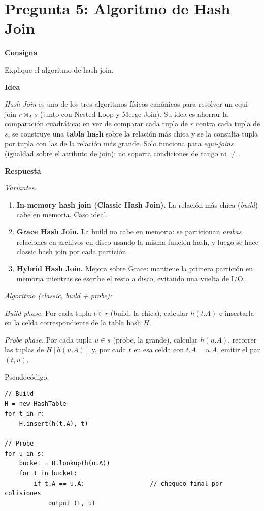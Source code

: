 \documentclass[11pt,a4paper]{article}
\newcommand{\itemcabecera}[1]{\noindent\textbf{#1}\par\medskip}
\newcommand{\bloqueConsigna}{\itemcabecera{Consigna}}
\newcommand{\bloqueIdea}{\itemcabecera{Idea}}
\newcommand{\bloqueRespuesta}{\itemcabecera{Respuesta}}
\begin{document}
\section{Pregunta 5: Algoritmo de Hash Join}

\bloqueConsigna

Explique el algoritmo de hash join.

\bloqueIdea

\emph{Hash Join} es uno de los tres algoritmos físicos canónicos para resolver un equi-join $r \bowtie_A s$ (junto con Nested Loop y Merge Join). Su idea es ahorrar la comparación cuadrática: en vez de comparar cada tupla de $r$ contra cada tupla de $s$, se construye una \textbf{tabla hash} sobre la relación más chica y se la consulta tupla por tupla con las de la relación más grande. Solo funciona para \emph{equi-joins} (igualdad sobre el atributo de join); no soporta condiciones de rango ni $\neq$.

\bloqueRespuesta

\textit{Variantes.}

\begin{enumerate}
    \item \textbf{In-memory hash join (Classic Hash Join).} La relación más chica (\emph{build}) cabe en memoria. Caso ideal.
    \item \textbf{Grace Hash Join.} La build no cabe en memoria: se particionan \emph{ambas} relaciones en archivos en disco usando la misma función hash, y luego se hace classic hash join por cada partición.
    \item \textbf{Hybrid Hash Join.} Mejora sobre Grace: mantiene la primera partición en memoria mientras se escribe el resto a disco, evitando una vuelta de I/O.
\end{enumerate}

\textit{Algoritmo (classic, build + probe):}

\textit{Build phase.} Por cada tupla $t \in r$ (build, la chica), calcular $h(t.A)$ e insertarla en la celda correspondiente de la tabla hash $H$.

\textit{Probe phase.} Por cada tupla $u \in s$ (probe, la grande), calcular $h(u.A)$, recorrer las tuplas de $H[h(u.A)]$ y, por cada $t$ en esa celda con $t.A = u.A$, emitir el par $(t, u)$.

Pseudocódigo:

\begin{lstlisting}[style=plain]
// Build
H = new HashTable
for t in r:
    H.insert(h(t.A), t)

// Probe
for u in s:
    bucket = H.lookup(h(u.A))
    for t in bucket:
        if t.A == u.A:                  // chequeo final por colisiones
            output (t, u)
\end{lstlisting}
\end{document}
